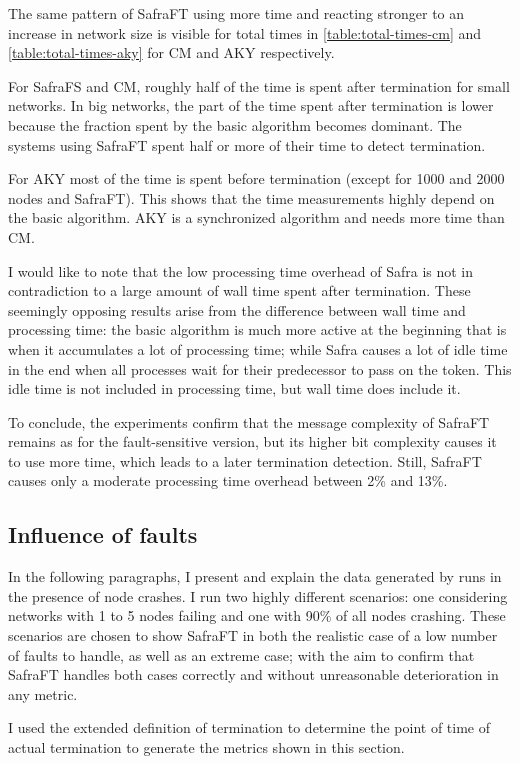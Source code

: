 The same pattern of SafraFT using more time and reacting stronger to an increase in network size is visible for total times in \cref{table:total-times-cm} and \cref{table:total-times-aky} for CM and AKY respectively.

For SafraFS and CM, roughly half of the time is spent after termination for small networks.
In big networks, the part of the time spent after termination is lower because the fraction spent by the basic algorithm becomes dominant.
The systems using SafraFT spent half or more of their time to detect termination.

For AKY most of the time is spent before termination (except for 1000 and 2000 nodes and SafraFT).
This shows that the time measurements highly depend on the basic algorithm.
AKY is a synchronized algorithm and needs more time than CM.

I would like to note that the low processing time overhead of Safra is not in contradiction to a large amount of wall time spent after termination.
These seemingly opposing results arise from the difference between wall time and processing time: the basic algorithm is much more active at the beginning that is when it accumulates a lot of processing time; while Safra causes a lot of idle time in the end when all processes wait for their predecessor to pass on the token.
This idle time is not included in processing time, but wall time does include it.

To conclude, the experiments confirm that the message complexity of SafraFT remains as for the fault-sensitive version, but its higher bit complexity causes it to use more time, which leads to a later termination detection.
Still, SafraFT causes only a moderate processing time overhead between 2\% and 13\%. %

\subsection{Influence of faults}
In the following paragraphs, I present and explain the data generated by runs in the presence of node crashes.
I run two highly different scenarios: one considering networks with 1 to 5 nodes failing and one with 90\% of all nodes crashing.
These scenarios are chosen to show SafraFT in both the realistic case of a low number of faults to handle, as well as an extreme case; with the aim to confirm that SafraFT handles both cases correctly and without unreasonable deterioration in any metric.

I used the extended definition of termination to determine the point of time of actual termination to generate the metrics shown in this section.

